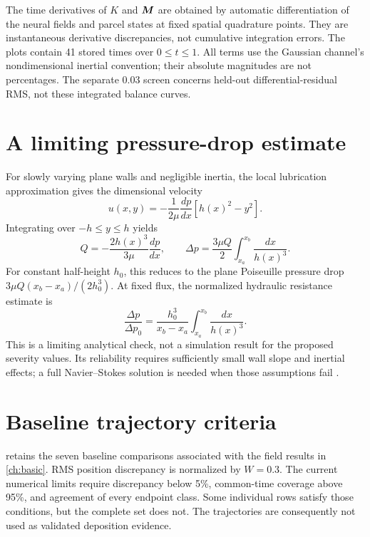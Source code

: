 The time derivatives of $K$ and $\bm{M}$ are obtained by automatic
differentiation of the neural fields and parcel states at fixed spatial
quadrature points. They are instantaneous derivative discrepancies,
not cumulative integration errors. The plots contain 41 stored times
over $0\leq t\leq1$. All terms use the Gaussian channel's nondimensional
inertial convention; their absolute magnitudes are not percentages.
The separate $0.03$ screen concerns held-out differential-residual RMS,
not these integrated balance curves.

\section{A limiting pressure-drop estimate}
For slowly varying plane walls and negligible inertia, the local
lubrication approximation gives the dimensional velocity
\begin{equation}
 u(x,y)=-\frac{1}{2\mu}\frac{dp}{dx}[h(x)^2-y^2].
\end{equation}
Integrating over $-h\leq y\leq h$ yields
\begin{equation}
 Q=-\frac{2h(x)^3}{3\mu}\frac{dp}{dx},\qquad
 \Delta p=\frac{3\mu Q}{2}\int_{x_a}^{x_b}\frac{dx}{h(x)^3}.
 \label{eq:lubrication_drop}
\end{equation}
For constant half-height $h_0$, this reduces to the plane Poiseuille
pressure drop $3\mu Q(x_b-x_a)/(2h_0^3)$. At fixed flux, the normalized
hydraulic resistance estimate is
\begin{equation}
 \frac{\Delta p}{\Delta p_0}
 =\frac{h_0^3}{x_b-x_a}\int_{x_a}^{x_b}\frac{dx}{h(x)^3}.
\end{equation}
This is a limiting analytical check, not a simulation result for the
proposed severity values. Its reliability requires sufficiently small wall
slope and inertial effects; a full Navier--Stokes solution is needed when
those assumptions fail \citep{batchelor1967}. %

\section{Baseline trajectory criteria}\label{sec:trajectory_appendix}
 retains the seven baseline comparisons associated
with the field results in \cref{ch:basic}. RMS position discrepancy is
normalized by $W=0.3$. The current numerical limits require discrepancy
below 5\%, common-time coverage above 95\%, and agreement of every endpoint
class. Some individual rows satisfy those conditions, but the complete set
does not. The trajectories are consequently not used as validated
deposition evidence.

